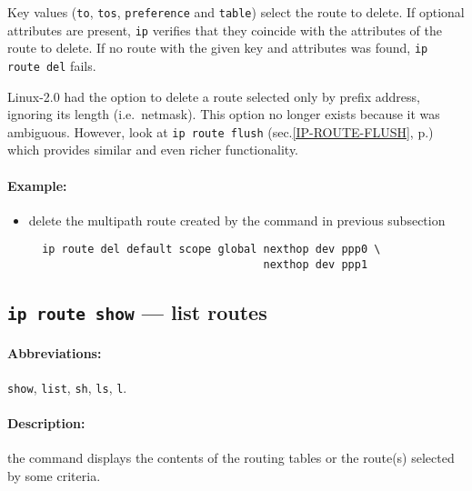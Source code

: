 Key values (\verb|to|, \verb|tos|, \verb|preference| and \verb|table|)
select the route to delete. If optional attributes are present, \verb|ip|
verifies that they coincide with the attributes of the route to delete.
If no route with the given key and attributes was found, \verb|ip route del|
fails.
\begin{NB}
Linux-2.0 had the option to delete a route selected only by prefix address,
ignoring its length (i.e.\ netmask). This option no longer exists
because it was ambiguous. However, look at {\tt ip route flush}
(sec.\ref{IP-ROUTE-FLUSH}, p.\pageref{IP-ROUTE-FLUSH}) which
provides similar and even richer functionality.
\end{NB}

\paragraph{Example:}
\begin{itemize}
\item delete the multipath route created by the command in previous subsection
\begin{verbatim}
  ip route del default scope global nexthop dev ppp0 \
                                    nexthop dev ppp1
\end{verbatim}
\end{itemize}



\subsection{{\tt ip route show} --- list routes}

\paragraph{Abbreviations:} \verb|show|, \verb|list|, \verb|sh|, \verb|ls|, \verb|l|.

\paragraph{Description:} the command displays the contents of the routing tables
or the route(s) selected by some criteria.


